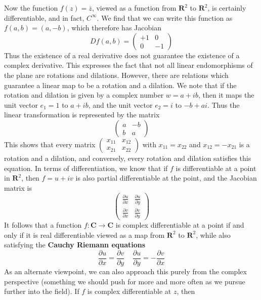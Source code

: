 Now the function $f(z) = \overline{z}$, viewed as a function from $\mathbf{R}^2$ to $\mathbf{R}^2$, is certainly differentiable, and in fact, $C^\infty$. We find that we can write this function as $f(a,b) = (a,-b)$, which therefore has Jacobian
%
\[ Df(a,b) = \begin{pmatrix} +1 & 0 \\ 0 & -1 \end{pmatrix} \]
%
Thus the existence of a real derivative does not guarantee the existence of a complex derivative. This expresses the fact that not all linear endomorphisms of the plane are rotations and dilations. However, there are relations which guarantee a linear map to be a rotation and a dilation. We note that if the rotation and dilation is given by a complex number $w = a + ib$, then it maps the unit vector $e_1 = 1$ to $a + ib$, and the unit vector $e_2 = i$ to $-b + ai$. Thus the linear transformation is represented by the matrix
%
\[ \begin{pmatrix} a & -b \\ b & a \end{pmatrix} \]
%
This shows that every matrix $\left( \begin{smallmatrix} x_{11} & x_{12} \\ x_{21} & x_{22} \end{smallmatrix} \right)$ with $x_{11} = x_{22}$ and $x_{12} = -x_{21}$ is a rotation and a dilation, and conversely, every rotation and dilation satisfies this equation. In terms of differentiation, we know that if $f$ is differentiable at a point in $\mathbf{R}^2$, then $f = u + iv$ is also partial differentiable at the point, and the Jacobian matrix is
%
\[ \begin{pmatrix} \frac{\partial u}{\partial x} & \frac{\partial u}{\partial y} \\ \frac{\partial v}{\partial x} & \frac{\partial v}{\partial y} \end{pmatrix} \]
%
It follows that a function $f: \mathbf{C} \to \mathbf{C}$ is complex differentiable at a point if and only if it is real differentiable viewed as a map from $\mathbf{R}^2$ to $\mathbf{R}^2$, while also satisfying the {\bf Cauchy Riemann equations}
%
\[ \frac{\partial u}{\partial x} = \frac{\partial v}{\partial y}\ \ \ \ \ \frac{\partial u}{\partial y} = -\frac{\partial v}{\partial x} \]
%
As an alternate viewpoint, we can also approach this purely from the complex perspective (something we should push for more and more often as we pursue further into the field). If $f$ is complex differentiable at $z$, then
